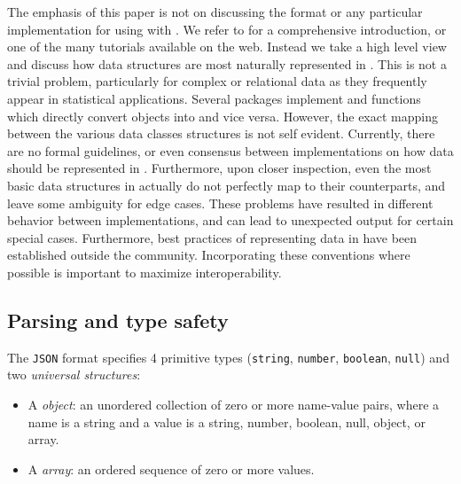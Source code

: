 The emphasis of this paper is not on discussing the \JSON format or any particular implementation for using \JSON with \R.  We refer to \cite{nolan2014xml} for a comprehensive introduction, or one of the many tutorials available on the web. Instead we take a high level view and discuss how \R data structures are most naturally represented in \JSON. This is not a trivial problem, particularly for complex or relational data as they frequently appear in statistical applications. Several \R packages implement \toJSON and \fromJSON functions which directly convert \R objects into \JSON and vice versa. However, the exact mapping between the various \R data classes \JSON structures is not self evident. Currently, there are no formal guidelines, or even consensus between implementations on how \R data should be represented in \JSON. Furthermore, upon closer inspection, even the most basic data structures in \R actually do not perfectly map to their \JSON counterparts, and leave some ambiguity for edge cases. These problems have resulted in different behavior between implementations, and can lead to unexpected output for certain special cases. Furthermore, best practices of representing data in \JSON have been established outside the \R community. Incorporating these conventions where possible is important to maximize interoperability.


\subsection{Parsing and type safety}

The \texttt{JSON} format specifies 4 primitive types (\texttt{string}, \texttt{number}, \texttt{boolean}, \texttt{null}) and two \emph{universal structures}:

\begin{itemize} %
  \item A \JSON \emph{object}: an unordered collection of zero or more name-value
   pairs, where a name is a string and a value is a string, number,
   boolean, null, object, or array.
  \item A \JSON \emph{array}: an ordered sequence of zero or more values.
\end{itemize}

